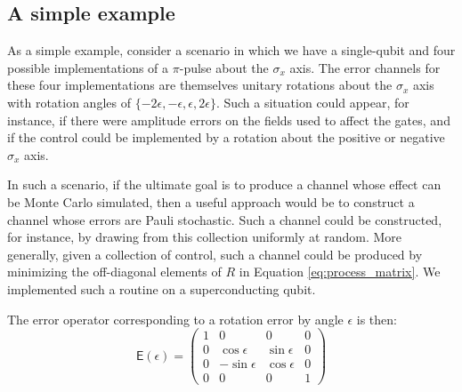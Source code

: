 \documentclass[aps,nofootinbib,pra,notitlepage,twocolumn]{revtex4-1}
\newcommand{\error}{\ensuremath{{\mathsf{E}}}}
\begin{document}
\subsection{A simple example}
\label{sec:simple_example}
As a simple example, consider a scenario in which we have a single-qubit and four possible implementations of a $\pi$-pulse about the $\sigma_x$ axis. The error channels for these four implementations are themselves unitary rotations about the $\sigma_x$ axis with rotation angles of $\{-2\epsilon, -\epsilon, \epsilon, 2\epsilon\}$. Such a situation could appear, for instance, if there were amplitude errors on the fields used to affect the gates, and if the control could be implemented by a rotation about the positive or negative $\sigma_x$ axis.



In such a scenario, if the ultimate goal is to produce a channel whose effect can be Monte Carlo simulated, then a useful approach would be to construct a channel whose errors are Pauli stochastic. Such a channel could be constructed, for instance, by drawing from this collection uniformly at random. More generally, given a collection of control, such a channel could be produced by minimizing the off-diagonal elements of $R$ in Equation \ref{eq:process_matrix}. We implemented such a routine on a superconducting qubit.

The error operator corresponding to a rotation error by angle $\epsilon$ is then:
\begin{equation}
\error(\epsilon) =
	\left(\begin{array}{ccccc}
		1 & 0 & 0 & 0 \\ 
		0 & \cos\epsilon & \sin\epsilon  & 0  \\
		0 & -\sin\epsilon & \cos\epsilon & 0  \\
		0 & 0 & 0 & 1
	\end{array} 	
	\right)
\end{equation}
\end{document}
